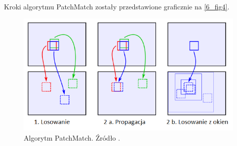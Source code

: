\documentclass[12pt, twoside, openany]{report}
\theoremstyle{definition}
\begin{document}
Kroki algorytmu PatchMatch zostały przedstawione graficznie na \autoref{6_fig4}.
\begin{figure}[!h]
	\centering
	\includegraphics[scale=0.9]{rysunki/6_fig4}
	\caption{Algorytm PatchMatch. Źródło \cite{arias2011variational}.}
	\label{6_fig4}
\end{figure}
\end{document}
